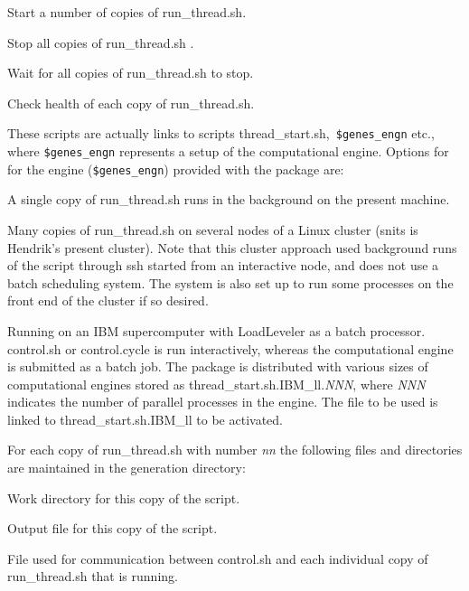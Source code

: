 \documentclass[12pt]{article}
\newcommand{\file}{\sf}
\newcommand{\code}{\tt}
\newenvironment{flist}{\begin{list}{nofile ?}{\parsep 0mm
            \itemsep 0mm \leftmargin 35mm \labelwidth 25mm
            \rightmargin 10mm}}{\end{list}}
\newenvironment{flist2}{\begin{list}{nofile ?}{\parsep 0mm
            \itemsep 0mm \leftmargin 45mm \labelwidth 35mm
            \rightmargin 10mm}}{\end{list}}
\newcommand{\fit}[2]{\item[{\file{#1}}\hfill]{#2}}
\newenvironment{plist}{\begin{list}{nofile ?}{\parsep 0mm
            \itemsep 0mm \leftmargin 35mm \labelwidth 25mm
            \rightmargin 10mm}}{\end{list}}
\newcommand{\pit}[2]{\item[{\code{#1}}\hfill]{#2}}
\begin{document}
\begin{flist2}
\fit{thread\_start.sh}{Start a number of copies of {\file run\_thread.sh}.}
\fit{thread\_stop.sh}{Stop all copies of {\file run\_thread.sh} .}
\fit{thread\_wait.sh}{Wait for all copies of {\file run\_thread.sh} to stop.}
\fit{thread\_check.sh}{Check health of each copy of {\file run\_thread.sh}.}
\end{flist2}

\noindent
These scripts are actually links to scripts {\file thread\_start.sh,}{\code
\$genes\_engn} etc., where {\code \$genes\_engn} represents a setup of the
computational engine. Options for for the engine ({\code \$genes\_engn})
provided with the package are:

\begin{plist}
\pit{single}{A single copy of {\file run\_thread.sh} runs in the background on
             the present machine.}
\pit{snits} {Many copies of {\file run\_thread.sh} on several nodes of a Linux
             cluster (snits is Hendrik's present cluster). Note that this
             cluster approach used background runs of the script through
             {\file ssh} started from an interactive node, and does not use a
             batch scheduling system. The system is also set up to run some
             processes on the front end of the cluster if so desired.}
\pit{IBM\_ll}{Running on an IBM supercomputer with LoadLeveler as a batch
              processor. {\file control.sh} or {\file control.cycle} is run
              interactively, whereas the computational engine is submitted as
              a batch job. The package is distributed with various sizes of
              computational engines stored as {\file
              thread\_start.sh.IBM\_ll.{\it NNN}}, where {\it NNN} indicates
              the number of parallel processes in the engine. The file to be
              used is linked to {\file thread\_start.sh.IBM\_ll} to be
              activated. }
\end{plist}

\noindent
For each copy of {\file run\_thread.sh} with number {\it nn} the following
files and directories are maintained in the generation directory:

\begin{flist}
\fit{thread\_{\it nnn}}{Work directory for this copy of the script.}
\fit{thread\_{\it nnn}.out}{Output file for this copy of the script.}
\fit{tdata.{\it nnn}.out}{File used for communication between {\file
                         control.sh} and each individual copy of {\file
                         run\_thread.sh} that is running.}
\end{flist}
\end{document}
